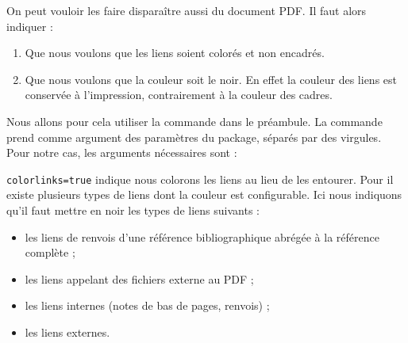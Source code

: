 On peut vouloir les faire disparaître aussi du document PDF. Il faut alors indiquer :
\begin{enumerate}
\item Que nous voulons que les liens soient colorés et non encadrés.
\item Que nous voulons que la couleur soit le noir. En effet la couleur des liens est conservée à l'impression, contrairement à la couleur des cadres.
\end{enumerate}

Nous allons pour cela utiliser la commande  dans le préambule. La commande prend comme argument des paramètres du package, séparés par des virgules.
Pour notre cas, les arguments nécessaires sont :

\begin{latexcode}
\hypersetup{colorlinks=true,
citecolor=black,
filecolor=black,
linkcolor=black,
urlcolor=black,
\end{latexcode}

\verb|colorlinks=true| indique nous colorons les liens au lieu de les entourer. Pour  il existe plusieurs types de liens dont la couleur est configurable. Ici nous indiquons qu'il faut mettre en noir les types de liens suivants  :\begin{itemize}
\item les liens de renvois d'une référence bibliographique abrégée à la référence complète ;
\item les liens appelant des fichiers externe au PDF ;
\item les liens internes (notes de bas de pages, renvois) ;
\item les liens externes.
\end{itemize}
